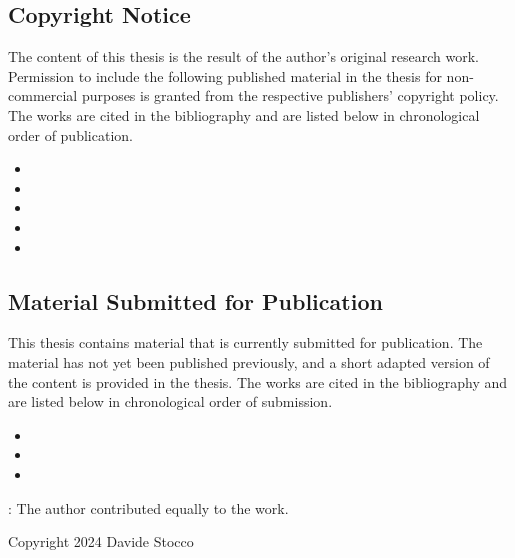 \documentclass[a4paper, 11pt, openright]{book} %
\date{January 2024}
\makeatletter
\newcommand*{\emptystyles}{%
\let\oldplain\ps@plain
\let\ps@plain\ps@empty
\pagestyle{empty}}
\let\ps@plain\ps@empty%
\makeatother
\begin{document}
\emptystyles

\hbox{}
\thispagestyle{empty}
\newpage

\subsection*{Copyright Notice}

The content of this thesis is the result of the author's original research work. Permission to include the following published material in the thesis for non-commercial purposes is granted from the respective publishers' copyright policy. The works are cited in the bibliography and are listed below in chronological order of publication.
%
\begin{itemize}
  \item {}
  \item {}
  \item {}
  \item {}
  \item {}
\end{itemize}

\subsection*{Material Submitted for Publication}

This thesis contains material that is currently submitted for publication. The material has not yet been published previously, and a short adapted version of the content is provided in the thesis. The works are cited in the bibliography and are listed below in chronological order of submission.
%
\begin{itemize}
  \item {}
  \item {}
  \item {}
\end{itemize}
%
\dag{}: The author contributed equally to the work.

\vspace*{\fill}

\begin{center}
  Copyright \textcopyright{} 2024 Davide Stocco \\
\end{center}
\thispagestyle{empty}
\cleardoublepage
\end{document}
